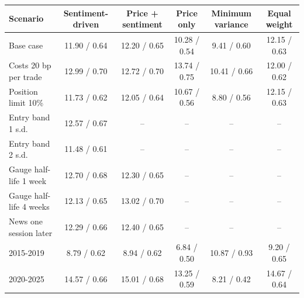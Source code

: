 \begin{tabular}{lccccc}
\toprule
Scenario & Sentiment-driven & Price + sentiment & Price only & Minimum variance & Equal weight \\
\midrule
Base case & 11.90 / 0.64 & 12.20 / 0.65 & 10.28 / 0.54 & 9.41 / 0.60 & 12.15 / 0.63 \\
Costs 20 bp per trade & 12.99 / 0.70 & 12.72 / 0.70 & 13.74 / 0.75 & 10.41 / 0.66 & 12.00 / 0.62 \\
Position limit 10\% & 11.73 / 0.62 & 12.05 / 0.64 & 10.67 / 0.56 & 8.80 / 0.56 & 12.15 / 0.63 \\
Entry band 1 s.d. & 12.57 / 0.67 & -- & -- & -- & -- \\
Entry band 2 s.d. & 11.48 / 0.61 & -- & -- & -- & -- \\
Gauge half-life 1 week & 12.70 / 0.68 & 12.30 / 0.65 & -- & -- & -- \\
Gauge half-life 4 weeks & 12.13 / 0.65 & 13.02 / 0.70 & -- & -- & -- \\
News one session later & 12.29 / 0.66 & 12.40 / 0.65 & -- & -- & -- \\
2015-2019 & 8.79 / 0.62 & 8.94 / 0.62 & 6.84 / 0.50 & 10.87 / 0.93 & 9.20 / 0.65 \\
2020-2025 & 14.57 / 0.66 & 15.01 / 0.68 & 13.25 / 0.59 & 8.21 / 0.42 & 14.67 / 0.64 \\
\bottomrule
\end{tabular}
